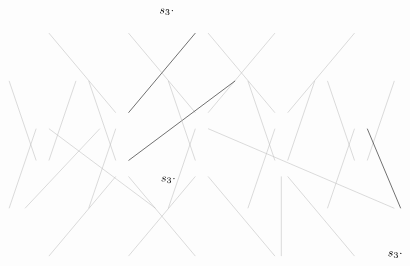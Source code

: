 \documentclass[12pt, reqno]{amsart}
\theoremstyle{definition}
\numberwithin{equation}{section} \numberwithin{figure}{section}
\numberwithin{table}{section}
\begin{document}
\begin{figure}[t]
\[{\begin{tikzpicture}[baseline = 0mm, scale = 0.8]
\draw [lightgray] (-\wtab-\wp,5*\htab - \hp) -- (-\wtab*2+\wp,4*\htab+\hp);
\draw [black] (\wp-\wtab,5*\htab - \hp) -- (0-\wp,4*\htab+\hp);
\node at (-0.44*\wtab, 4.45*\htab+\hp) {\color{black}\footnotesize $s_3\cdot$};
\draw [lightgray] (-\wp,5*\htab - \hp) -- (-\wtab+\wp,4*\htab+\hp);
\draw [lightgray] (\wp,5*\htab - \hp) -- (\wtab-\wp,4*\htab+\hp);
\draw [lightgray] (-\wp+\wtab,5*\htab - \hp) -- (0+\wp,4*\htab+\hp);
\draw [lightgray] (\wp+\wtab,5*\htab - \hp) -- (2*\wtab-\wp,4*\htab+\hp);

\draw [lightgray] (-\wtab*2-\wp,4*\htab-\hp) -- (-\wtab/2*5+\wp,3*\htab+\hp);
\draw [lightgray] (-\wtab*2+\wp,4*\htab-\hp) -- (-\wtab/2*3-\wp,3*\htab+\hp);
\draw [lightgray] (-\wtab-\wp,4*\htab-\hp) -- (-\wtab/2*3+\wp,3*\htab+\hp);
\draw [black] (-\wtab+\wp,4*\htab-\hp) -- (\wtab/2-\wp,3*\htab+\hp);
\node at (-\wtab * 0.5+\wp,3.6*\htab-\hp) {\footnotesize $s_3\cdot$};
\draw [lightgray] (-\wp,4*\htab-\hp) -- (-\wtab/2+\wp,3*\htab+\hp);
\draw [lightgray] (\wtab-\wp,4*\htab-\hp) -- (\wtab/2+\wp,3*\htab+\hp);
\draw [lightgray] (\wtab+\wp,4*\htab-\hp) -- (\wtab/2*3-\wp,3*\htab+\hp);
\draw [lightgray] (2*\wtab-\wp,4*\htab-\hp) -- (\wtab/2*3+\wp,3*\htab+\hp);
\draw [lightgray] (2*\wtab+\wp,4*\htab-\hp) -- (\wtab/2*5-\wp,3*\htab+\hp);

\draw [lightgray] (-\wtab/2*5+\wp,3*\htab-\hp) -- (-\wtab*2-\wp,2*\htab+\hp);
\draw [lightgray] (-\wtab*2.3+\wp,3*\htab-\hp) -- (-1.2*\wtab-\wp,2*\htab+\hp);
\draw [lightgray] (-\wtab/2-\wp,3*\htab-\hp) -- (-\wtab*2+\wp,2*\htab+\hp);
\draw [lightgray] (-\wtab/2+\wp,3*\htab-\hp) -- (-\wp,2*\htab+\hp);
\draw [lightgray] (\wtab/2+\wp,3*\htab-\hp) -- (\wtab-\wp,2*\htab+\hp);
\draw [lightgray] (\wtab/2*3+\wp,3*\htab-\hp) -- (\wtab*2-\wp,2*\htab+\hp);
\draw [lightgray] (\wtab/2*5-\wp,3*\htab-\hp) -- (\wp,2*\htab+\hp);
\draw [black] (\wtab/2*5,3*\htab-\hp) -- (\wtab*2+\wp,2*\htab+\hp);
\node at (\wtab*2.35+\wp,2.7*\htab-1.5*\hp) {\footnotesize $s_3\cdot$};
\draw [lightgray] (-\wtab/2*3+\wp,3*\htab-\hp) -- (-\wtab-\wp,2*\htab+\hp);

\draw [lightgray] (-\wtab*2+\wp,2*\htab-\hp) -- (-\wtab-\wp, \htab+\hp);
\draw [lightgray] (-\wp,2*\htab-\hp) -- (-\wtab+\wp, \htab+\hp);
\draw [lightgray] (\wtab-\wp,2*\htab-\hp) -- (\wp, \htab+\hp);
\draw [lightgray] (\wtab,2*\htab-\hp) -- (\wtab, \htab+\hp);
\draw [lightgray] (2*\wtab-\wp,2*\htab-\hp) -- (\wtab+\wp, \htab+\hp);
\draw [lightgray] (-\wtab+\wp,2*\htab-\hp) -- (-\wp, \htab+\hp);


\end{tikzpicture}}\]
\end{figure}
\end{document}
